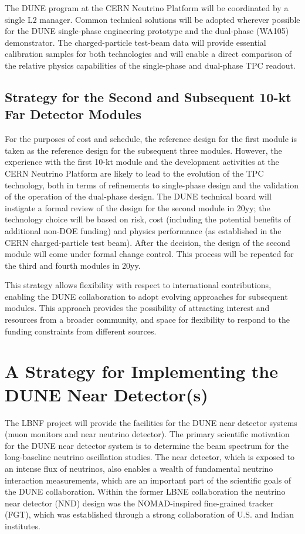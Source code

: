 The DUNE program at the CERN Neutrino Platform will be coordinated by a single 
L2 manager. Common technical solutions will be adopted wherever possible for the 
DUNE single-phase engineering prototype and the dual-phase (WA105) demonstrator. 
The charged-particle test-beam data will provide essential calibration samples 
for both technologies and will enable a direct comparison of the relative physics 
capabilities of the single-phase and dual-phase TPC readout. 

\subsection{Strategy for the Second and Subsequent 10-kt Far Detector Modules}

For the purposes of cost and schedule, the reference design for the first module 
is taken as the reference design for the subsequent three modules. However, 
the experience with the first 10-kt module and the development activities at 
the CERN Neutrino Platform are likely to lead to the evolution of the TPC technology, both 
in terms of refinements to single-phase design and the validation of the operation 
of the dual-phase design. The DUNE technical board will instigate a formal review 
of the design for the second module in 20yy; %
the technology choice 
will be based on risk, cost (including the potential benefits of additional 
non-DOE funding) and physics performance (as established in the CERN charged-particle 
test beam). After the decision, the design of the second module will come under formal 
change control. This process will be repeated for the third and fourth modules 
in 20yy.%

This strategy allows flexibility with respect to international contributions, 
enabling the DUNE collaboration to
adopt evolving approaches for subsequent modules. This approach provides the possibility of attracting interest 
and resources from a broader community, and space for flexibility to respond to 
the funding constraints from different sources. 

\section{A Strategy for Implementing the DUNE Near Detector(s)}

The LBNF project will provide the facilities for the DUNE near detector systems 
(muon monitors and near neutrino detector). The primary scientific motivation for 
the DUNE near detector system is to determine the beam spectrum for the long-baseline 
neutrino oscillation studies. The near detector, which is exposed to an intense 
flux of neutrinos, also enables a wealth of fundamental neutrino 
interaction measurements, which are an important part of the  scientific 
goals of the DUNE collaboration. Within the former LBNE collaboration the neutrino 
near detector (NND) design was the NOMAD-inspired fine-grained tracker (FGT), which 
was established through a strong collaboration of U.S. and Indian institutes.

